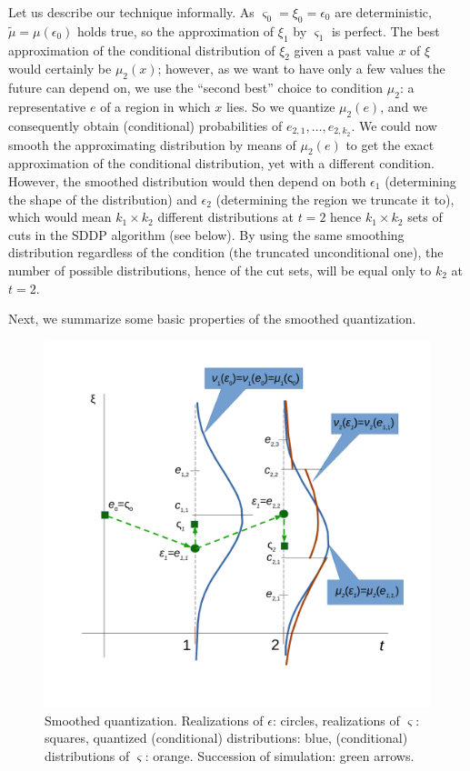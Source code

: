 \documentclass{article}              %
\begin{document}
\noindent Let us describe our technique informally. As $\varsigma_{0}=\xi_0=\epsilon_0$ are deterministic, $\tilde \mu=\mu(\epsilon_0)$ holds true, so the approximation of $\xi_1$ by $\varsigma_1$ is perfect. 
The best approximation of the conditional distribution of $\xi_2$ given a past value $x$ of $\xi$ would certainly be $\mu_2(x)$; however, as we want to have only a few values the future can depend on, we use the ``second best'' choice to condition $\mu_2$: a representative $e$ of a region in which $x$ lies. So we quantize $\mu_2(e)$, and we consequently obtain (conditional) probabilities of $e_{2,1},\dots,e_{2,k_2}$. We could now smooth the approximating distribution by means of $\mu_2(e)$ to get the exact approximation of the conditional distribution, yet with a different condition. However, the smoothed distribution would then depend on both $\epsilon_1$ (determining the shape of the distribution) and $\epsilon_2$ (determining the region we truncate it to), which would mean $k_1 \times k_2$ different distributions at $t=2$ hence $k_1 \times k_2$ sets of cuts in the SDDP algorithm (see below). By using the same smoothing distribution regardless of the condition (the truncated unconditional one), the number of possible distributions, hence of the cut sets, will be equal only to $k_2$ at $t=2$.

Next, we summarize some basic properties of the smoothed quantization. 

\begin{figure}
\begin{center}
\includegraphics[scale=0.5]{illust}
\caption{Smoothed quantization. Realizations of $\epsilon$: circles, realizations of $\varsigma$: squares, quantized (conditional) distributions: blue, (conditional) distributions of $\varsigma$: orange. Succession of simulation: green arrows.}
\label{fig:ilust1}
\end{center}
\end{figure}
\end{document}
